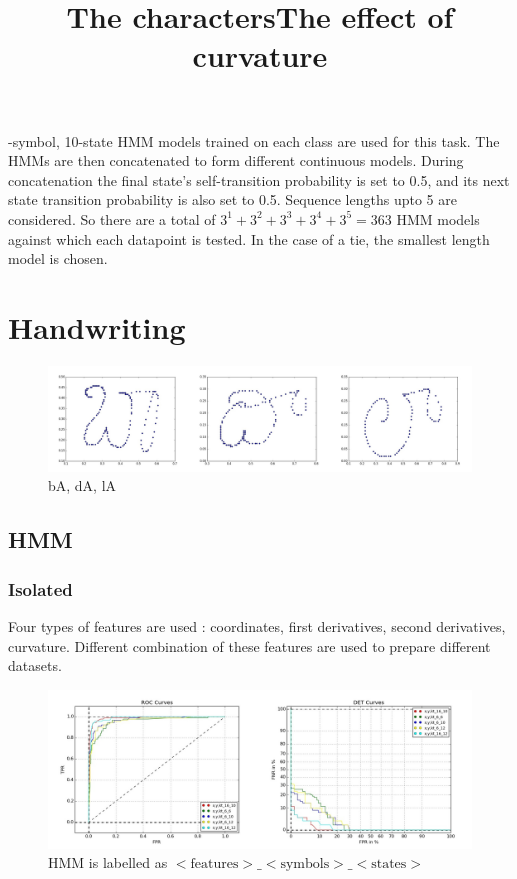 \documentclass{article}
\begin{document}
-symbol, 10-state HMM models trained on each class are used for this task. The HMMs are then concatenated to form different continuous models. During concatenation the final state's self-transition probability is set to 0.5, and its next state transition probability is also set to 0.5. Sequence lengths upto 5 are considered. So there are a total of $ 3^1 + 3^2 + 3^3 + 3^4 + 3^5 = 363$ HMM models against which each datapoint is tested. In the case of a tie, the smallest length model is chosen.

\section{Handwriting}
\begin{figure}[h!]
\centering
\title{The characters}
\includegraphics[width=\textwidth]{handwriting/plots/viz/train/bAdAlA.jpg}
\caption{bA, dA, lA}
\end{figure}
\subsection{HMM}
\subsubsection{Isolated}
Four types of features are used : coordinates, first derivatives, second derivatives, curvature. Different combination of these features are used to prepare different datasets.

\begin{figure}[h!]
\centering
\title{The effect of curvature}
\includegraphics[width=\textwidth]{handwriting/plots/hmm/roc_det_x,y,kt.jpg}
\caption{HMM is labelled as $<\text{features}>\_<\text{symbols}>\_<\text{states}>$}
\end{figure}
\end{document}
